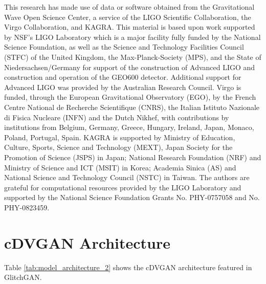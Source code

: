 \documentclass[reprint,nofootinbib,amsmath,amssymb,aps,floatfix]{revtex4-2}
\begin{document}
This research has made use of data or software obtained from the Gravitational Wave Open Science Center, a service of the LIGO Scientific Collaboration, the Virgo Collaboration, and KAGRA. This material is based upon work supported by NSF's LIGO Laboratory which is a major facility fully funded by the National Science Foundation, as well as the Science and Technology Facilities Council (STFC) of the United Kingdom, the Max-Planck-Society (MPS), and the State of Niedersachsen/Germany for support of the construction of Advanced LIGO and construction and operation of the GEO600 detector. Additional support for Advanced LIGO was provided by the Australian Research Council. Virgo is funded, through the European Gravitational Observatory (EGO), by the French Centre National de Recherche Scientifique (CNRS), the Italian Istituto Nazionale di Fisica Nucleare (INFN) and the Dutch Nikhef, with contributions by institutions from Belgium, Germany, Greece, Hungary, Ireland, Japan, Monaco, Poland, Portugal, Spain. KAGRA is supported by Ministry of Education, Culture, Sports, Science and Technology (MEXT), Japan Society for the Promotion of Science (JSPS) in Japan; National Research Foundation (NRF) and Ministry of Science and ICT (MSIT) in Korea; Academia Sinica (AS) and National Science and Technology Council (NSTC) in Taiwan.
The authors are grateful for computational resources provided by the LIGO Laboratory and supported by the National Science Foundation Grants No. PHY-0757058 and No. PHY-0823459.


\clearpage

\vspace{-5mm}

\appendix

\section{\label{sec:cDVGAN_Architecture}cDVGAN Architecture}

Table \ref{tab:model_architecture_2} shows the cDVGAN architecture featured in GlitchGAN.
\end{document}
